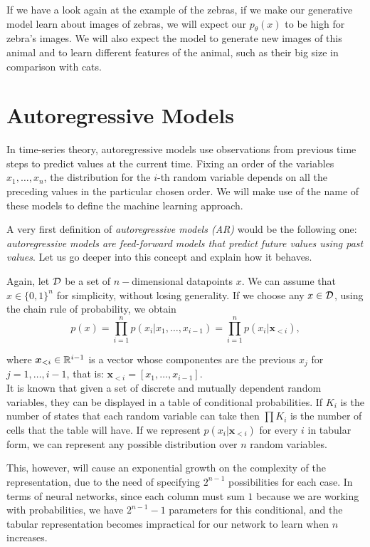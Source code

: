 If we have a look again at the example of the zebras, if we make our generative model learn about images of zebras, we will expect our $p_\theta(x)$ to be high for zebra's images. We will also expect the model
to generate new images of this animal and to learn different features of the animal, such as their big size in comparison with cats.

\section{Autoregressive Models}

In time-series theory, autoregressive models use observations from previous time steps to predict values at the current time. 
Fixing an order of the variables $x_1,\dots,x_n$, the distribution for the $i$-th random variable depends on all the preceding values in the particular chosen order. We will make use of the name of these models to 
define the machine learning approach.

A very first definition of \emph{autoregressive models (AR)} would be the following one: \emph{autoregressive models are feed-forward models that predict future values using past values}. Let us go deeper into this 
concept and explain how it behaves.

Again, let $\mathcal{D}$ be a set of $n-$dimensional datapoints $x$. We can assume that $x \in \{0,1\}^n$ for simplicity, without losing generality. If we choose any $x\in \mathcal{D}$, using the chain rule of probability, we obtain
\[
p(x) = \prod_{i=1} ^n p(x_i | x_1,\dots,x_{i-1}) = \prod_{i = 1}^n p(x_i|\bm{x}_{<i}),
\]

where $\bm{x}_{<i} \in \mathbb{R}^{i-1}$ is a vector whose componentes are the previous $x_j$ for $j = 1,\dots, i-1$, that is: $\bm{x}_{<i}= [x_1,\dots, x_{i-1}]$. \\
It is known that given a set of discrete and mutually dependent random variables, they can be displayed in a table of conditional probabilities. If $K_i$ is the number of states that each random variable can take
then $\prod K_i$ is the number of cells that the table will have. If we represent $p(x_i|\bm{x}_{<i})$ for every $i$ in tabular form, we can represent
any possible distribution over $n$ random variables. 

This, however, will cause an exponential growth on the complexity of the representation, due to the need of specifying $2^{n-1}$ possibilities 
for each case. In terms of neural networks, since each column must sum $1$ because we are working with probabilities, we have $2^{n-1}-1$ parameters for this conditional, and the tabular representation
becomes impractical for our network to learn when $n$ increases.

